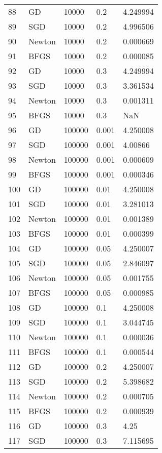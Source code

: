 \begin{tabular}{lllll}
88  &      GD &    10000 &    0.2 &  4.249994 \\
89  &     SGD &    10000 &    0.2 &  4.996506 \\
90  &  Newton &    10000 &    0.2 &  0.000669 \\
91  &    BFGS &    10000 &    0.2 &  0.000085 \\
92  &      GD &    10000 &    0.3 &  4.249994 \\
93  &     SGD &    10000 &    0.3 &  3.361534 \\
94  &  Newton &    10000 &    0.3 &  0.001311 \\
95  &    BFGS &    10000 &    0.3 &       NaN \\
96  &      GD &   100000 &  0.001 &  4.250008 \\
97  &     SGD &   100000 &  0.001 &   4.00866 \\
98  &  Newton &   100000 &  0.001 &  0.000609 \\
99  &    BFGS &   100000 &  0.001 &  0.000346 \\
100 &      GD &   100000 &   0.01 &  4.250008 \\
101 &     SGD &   100000 &   0.01 &  3.281013 \\
102 &  Newton &   100000 &   0.01 &  0.001389 \\
103 &    BFGS &   100000 &   0.01 &  0.000399 \\
104 &      GD &   100000 &   0.05 &  4.250007 \\
105 &     SGD &   100000 &   0.05 &  2.846097 \\
106 &  Newton &   100000 &   0.05 &  0.001755 \\
107 &    BFGS &   100000 &   0.05 &  0.000985 \\
108 &      GD &   100000 &    0.1 &  4.250008 \\
109 &     SGD &   100000 &    0.1 &  3.044745 \\
110 &  Newton &   100000 &    0.1 &  0.000036 \\
111 &    BFGS &   100000 &    0.1 &  0.000544 \\
112 &      GD &   100000 &    0.2 &  4.250007 \\
113 &     SGD &   100000 &    0.2 &  5.398682 \\
114 &  Newton &   100000 &    0.2 &  0.000705 \\
115 &    BFGS &   100000 &    0.2 &  0.000939 \\
116 &      GD &   100000 &    0.3 &      4.25 \\
117 &     SGD &   100000 &    0.3 &  7.115695 \\

\end{tabular}
